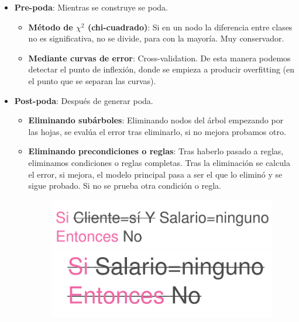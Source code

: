 \documentclass[12pt, twoside, openright]{report} %
\begin{document}
\begin{itemize}
	\item \textbf{Pre-poda}: Mientras se construye se poda.

	      \begin{itemize}
		      \item \textbf{Método de \(\chi^2\) (chi-cuadrado)}: Si en un nodo la
		            diferencia entre clases no es significativa, no se divide, para con
		            la mayoría. Muy conservador.
		      \item \textbf{Mediante curvas de error}: Cross-validation. De esta manera
		            podemos detectar el punto de inflexión, donde se empieza a producir
		            overfitting (en el punto que se separan las curvas).
	      \end{itemize}
	\item \textbf{Post-poda}: Después de generar poda.

	      \begin{itemize}
		      \item \textbf{Eliminando subárboles}: Eliminando nodos del árbol empezando
		            por las hojas, se evalúa el error tras eliminarlo, si no mejora
		            probamos otro.
		            \pagebreak
		      \item \textbf{Eliminando precondiciones o reglas}: Tras haberlo pasado a
		            reglas, eliminamos condiciones o reglas completas. Tras la
		            eliminación se calcula el error, si mejora, el modelo principal pasa
		            a ser el que lo eliminó y se sigue probado. Si no se prueba otra
		            condición o regla.
		            \begin{figure}[H]
			            {\includegraphics[scale=.2]{image-20210305201114245.png}
				            \includegraphics[scale=.2]{image-20210305201127523.png}}
		            \end{figure}
	      \end{itemize}
\end{itemize}
\end{document}
